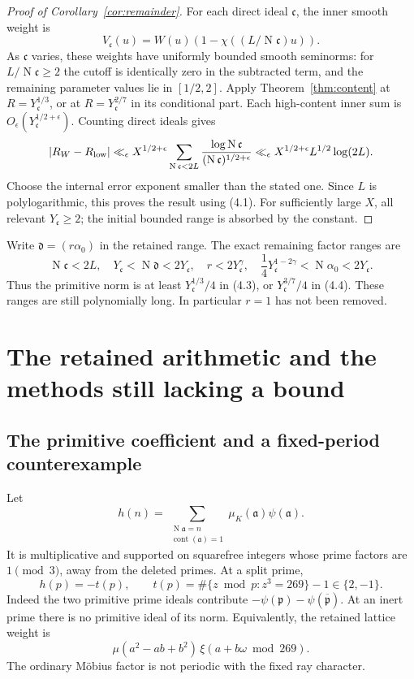 \documentclass[11pt]{article}
\newcommand{\N}{\operatorname N}
\newcommand{\cont}{\operatorname{cont}}
\begin{document}
\begin{proof}[Proof of Corollary~\ref{cor:remainder}]
For each direct ideal $\mathfrak c$, the inner smooth weight is
\[
 V_{\mathfrak c}(u)=W(u)
            (1-\chi((L/\N\mathfrak c)u)).
\]
As $\mathfrak c$ varies, these weights have uniformly bounded
smooth seminorms: for $L/\N\mathfrak c\ge2$ the cutoff is
identically zero in the subtracted term, and the remaining
parameter values lie in $[1/2,2]$.
Apply Theorem~\ref{thm:content} at
$R=Y_{\mathfrak c}^{1/3}$, or at
$R=Y_{\mathfrak c}^{2/7}$ in its conditional part.
Each high-content inner sum is
$O_\epsilon(Y_{\mathfrak c}^{1/2+\epsilon})$.
Counting direct ideals gives
\[
 |R_W-R_{\rm low}|
 \ll_\epsilon X^{1/2+\epsilon}
       \sum_{\N\mathfrak c<2L}
         \frac{\log\N\mathfrak c}
              {(\N\mathfrak c)^{1/2+\epsilon}}
 \ll_\epsilon X^{1/2+\epsilon}L^{1/2}\log(2L).
\]
Choose the internal error exponent smaller than the stated one.
Since $L$ is polylogarithmic, this proves the result using
(4.1). For sufficiently large $X$, all relevant
$Y_{\mathfrak c}\ge2$; the initial bounded range is absorbed
by the constant.
\end{proof}

Write $\mathfrak d=(r\alpha_0)$ in the retained range.
The exact remaining factor ranges are
\[
 \N\mathfrak c<2L,\quad
 Y_{\mathfrak c}<\N\mathfrak d<2Y_{\mathfrak c},\quad
 r<2Y_{\mathfrak c}^{\gamma},\quad
 \frac14Y_{\mathfrak c}^{1-2\gamma}
                 <\N\alpha_0<2Y_{\mathfrak c}.           \tag{4.5}
\]
Thus the primitive norm is at least
$Y_{\mathfrak c}^{1/3}/4$ in (4.3), or
$Y_{\mathfrak c}^{3/7}/4$ in (4.4).
These ranges are still polynomially long. In particular
$r=1$ has not been removed.

\section{The retained arithmetic and the methods still lacking a bound}

\subsection{The primitive coefficient and a fixed-period counterexample}

Let
\[
 h(n)=\sum_{\substack{\N\mathfrak a=n\\\cont(\mathfrak a)=1}}
                         \mu_K(\mathfrak a)\psi(\mathfrak a).
\]
It is multiplicative and supported on squarefree integers
whose prime factors are $1\pmod3$, away from the deleted primes.
At a split prime,
\[
 h(p)=-t(p),\qquad
 t(p)=\#\{z\bmod p:z^3=269\}-1\in\{2,-1\}.               \tag{5.1}
\]
Indeed the two primitive prime ideals contribute
$-\psi(\mathfrak p)-\psi(\overline{\mathfrak p})$.
At an inert prime there is no primitive ideal of its norm.
Equivalently, the retained lattice weight is
\[
       \mu(a^2-ab+b^2)\,\xi(a+b\omega\bmod269).            \tag{5.2}
\]
The ordinary M\"obius factor is not periodic with the
fixed ray character.
\end{document}
